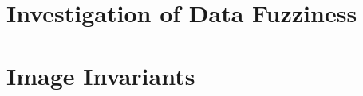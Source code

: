 \section{Investigation of Data Fuzziness}



\section{Image Invariants}





























